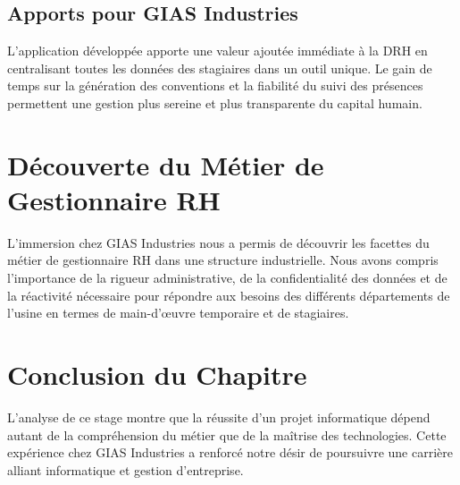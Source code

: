 \subsection{Apports pour GIAS Industries}
L'application développée apporte une valeur ajoutée immédiate à la DRH en centralisant toutes les données des stagiaires dans un outil unique. Le gain de temps sur la génération des conventions et la fiabilité du suivi des présences permettent une gestion plus sereine et plus transparente du capital humain.

\section{Découverte du Métier de Gestionnaire RH}
L'immersion chez GIAS Industries nous a permis de découvrir les facettes du métier de gestionnaire RH dans une structure industrielle. Nous avons compris l'importance de la rigueur administrative, de la confidentialité des données et de la réactivité nécessaire pour répondre aux besoins des différents départements de l'usine en termes de main-d'œuvre temporaire et de stagiaires.

\section{Conclusion du Chapitre}
L'analyse de ce stage montre que la réussite d'un projet informatique dépend autant de la compréhension du métier que de la maîtrise des technologies. Cette expérience chez GIAS Industries a renforcé notre désir de poursuivre une carrière alliant informatique et gestion d'entreprise.